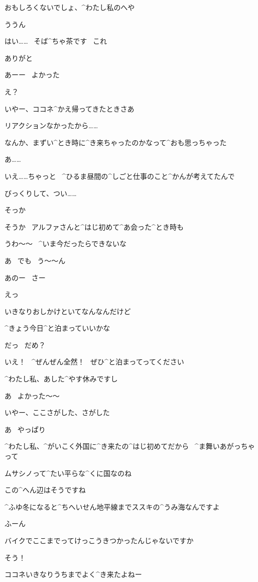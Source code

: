 \page
\K おもしろくないでしょ、^{わたし}{私}のへや

\A ううん

\K はい……
\ そば^{ちゃ}{茶}です
\ これ

\A ありがと

\page
\A あーー
\ よかった

\K え？

\A いやー、ココネ^{かえ}{帰}ってきたときさあ

\A リアクションなかったから……

\A なんか、まずい^{とき}{時}に^{き}{来}ちゃったのかなって^{おも}{思}っちゃった

\K あ……

\K いえ……ちゃっと
\ ^{ひるま}{昼間}の^{しごと}{仕事}のこと^{かんが}{考}えてたんで

\K びっくりして、つい……

\A そっか

\page
\K そうか
\ アルファさんと^{はじ}{初}めて^{あ}{会}った^{とき}{時}も

\K うわ〜〜
\ ^{いま}{今}だったらできないな

\K あ
\ でも
\ う〜〜ん

\page
\A あのー
\ さー

\K えっ

\A いきなりおしかけといてなんなんだけど

\A ^{きょう}{今日}^{と}{泊}まっていいかな

\A だっ
\ だめ？

\K いえ！
\ ^{ぜんぜん}{全然}！
\ ぜひ^{と}{泊}まってってください

\K ^{わたし}{私}、あした^{やす}{休}みですし

\A あ
\ よかった〜〜

\page
\A いやー、ここさがした、さがした

\K あ
\ やっぱり

\A ^{わたし}{私}、^{がいこく}{外国}に^{き}{来}たの^{はじ}{初}めてだから
\ ^{ま}{舞}いあがっちゃって

\A ムサシノって^{たい}{平}らな^{くに}{国}なのね

\K この^{へん}{辺}はそうですね

\K ^{ふゆ}{冬}になると^{ちへいせん}{地平線}までススキの^{うみ}{海}なんですよ

\A ふーん

\page
\K バイクでここまでってけっこうきつかったんじゃないですか

\A そう！

\A ココネいきなりうちまでよく^{き}{来}たよねー


